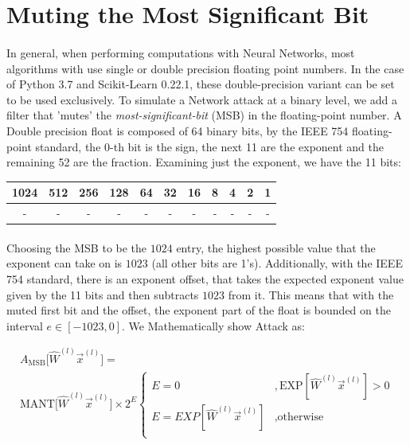 \documentclass[12pt,letterpaper]{article}
\begin{document}
\section*{Muting the Most Significant Bit}

\paragraph*{}In general, when performing computations with Neural Networks, most algorithms with use single or double precision floating point numbers.  In the case of Python 3.7 and Scikit-Learn 0.22.1, these double-precision variant can be set to be used exclusively. To simulate a Network attack at a binary level, we add a filter that 'mutes' the \textit{most-significant-bit} (MSB) in the floating-point number. A Double precision float is composed of 64 binary bits, by the IEEE 754 floating-point standard, the 0-th bit is the sign, the next 11 are the exponent and the remaining 52 are the fraction. Examining just the exponent, we have the 11 bits:

\begin{center}
\begin{tabular}{|c|c|c|c|c|c|c|c|c|c|c|}
\hline
1024 & 512 & 256 & 128 & 64 & 32 & 16 & 8 & 4 & 2 & 1 \\ \hline
- & - & - & - & - & - & - & - & - & - & -  \\ \hline
\end{tabular}
\end{center}

\paragraph*{}Choosing the MSB to be the $1024$ entry, the highest possible value that the exponent can take on is $1023$ (all other bits are 1's). Additionally, with the IEEE 754 standard, there is an exponent offset, that takes the expected exponent value given by the 11 bits and then subtracts $1023$ from it. This means that with the muted first bit and the offset, the exponent part of the float is bounded on the interval 
$e \in [-1023,0]$. We Mathematically show Attack as:

\begin{multline}
\label{mute MSB attack}
A_{\text{MSB}} \big[ \hat{W}^{(l)} \vec{x}^{(l)} \big] = \\
\text{MANT} \big[ \hat{W}^{(l)} \vec{x}^{(l)} \big] \times 2^{E}
\left\{
        \begin{array}{ll}
            E = 0 									&, \text{EXP}[\hat{W}^{(l)} \vec{x}^{(l)}] > 0 \\
            E = EXP[\hat{W}^{(l)} \vec{x}^{(l)}] 	&, \text{otherwise} \\
        \end{array}
    \right.
\end{multline}
\end{document}
